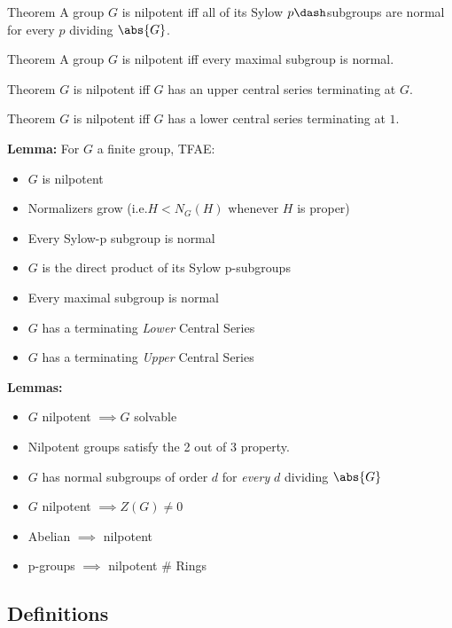 Theorem A group \(G\) is nilpotent iff all of its Sylow
\(p\dash\)subgroups are normal for every \(p\) dividing \(\abs{G}\).

Theorem A group \(G\) is nilpotent iff every maximal subgroup is normal.

Theorem \(G\) is nilpotent iff \(G\) has an upper central series
terminating at \(G\).

Theorem \(G\) is nilpotent iff \(G\) has a lower central series
terminating at \(1\).

\textbf{Lemma:} For \(G\) a finite group, TFAE:

\begin{itemize}
\tightlist
\item
  \(G\) is nilpotent
\item
  Normalizers grow (i.e.\(H < N_G(H)\) whenever \(H\) is proper)
\item
  Every Sylow-p subgroup is normal
\item
  \(G\) is the direct product of its Sylow p-subgroups
\item
  Every maximal subgroup is normal
\item
  \(G\) has a terminating \emph{Lower} Central Series
\item
  \(G\) has a terminating \emph{Upper} Central Series
\end{itemize}

\textbf{Lemmas:}

\begin{itemize}
\tightlist
\item
  \(G\) nilpotent \(\implies G\) solvable
\item
  Nilpotent groups satisfy the 2 out of 3 property.
\item
  \(G\) has normal subgroups of order \(d\) for \emph{every} \(d\)
  dividing \(\abs{G}\)
\item
  \(G\) nilpotent \(\implies Z(G) \neq 0\)
\item
  Abelian \(\implies\) nilpotent
\item
  p-groups \(\implies\) nilpotent \# Rings
\end{itemize}

\hypertarget{definitions}{%
\subsection{Definitions}\label{definitions}}

